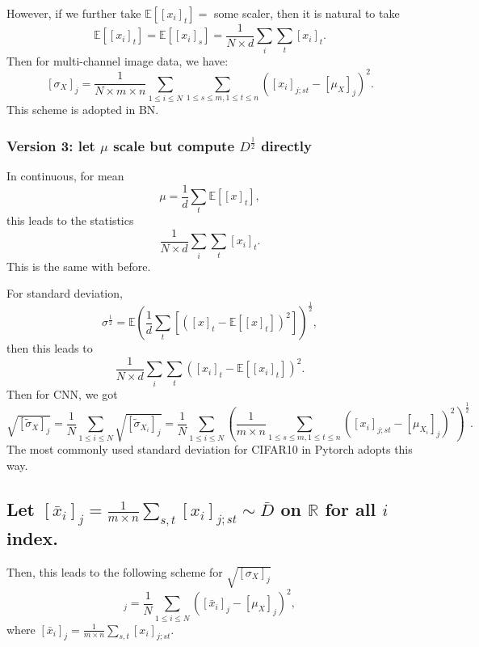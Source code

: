 However, if we further take $\mathbb{E}[[x_i]_t] = $ some scaler, then it is natural to take  
\begin{equation}\label{key}
\mathbb{E}[[x_i]_t] = \mathbb{E}[[x_i]_s] = \frac{1}{N \times d} \sum_{i} \sum_{t} [x_i]_t.
\end{equation}
Then for multi-channel image data, we have:
\begin{equation}\label{key}
[\sigma_X]_j = \frac{1}{ N \times m\times n} \sum_{ 1 \le i \le N} \sum_{1\le s \le m, 1 \le t \le n} ([x_i]_{j;st} -[\mu_X]_j )^2.
\end{equation}
This scheme is adopted in BN.

\subsubsection{Version 3:   let $\mu$  scale but compute $D^{\frac{1}{2}}$ directly}
In continuous, for mean
\begin{equation}\label{key}
\mu = \frac{1}{d} \sum_t \mathbb{E}[[x]_t],
\end{equation}
this leads to the statistics 
\begin{equation}\label{key}
\frac{1}{N \times d} \sum_{i} \sum_{t} [x_i]_t.
\end{equation}
This is the same with before.

For standard deviation,
\begin{equation}\label{key}
\sigma^{\frac{1}{2}} =  \mathbb{E} (\frac{1}{d} \sum_t [([x]_t - \mathbb{E}[[x]_t])^2])^{\frac{1}{2}},
\end{equation}
then this leads to
\begin{equation}\label{key}
\frac{1}{N \times d} \sum_{i} \sum_{t} ([x_i]_t - \mathbb{E}[[x_i]_t])^2.
\end{equation}
Then for CNN, we got
\begin{equation}\label{key}
\sqrt{[\tilde \sigma_X]_j} = \frac{1}{ N} \sum_{ 1 \le i \le N} \sqrt{[\tilde \sigma_{X_i}]_j}  =\frac{1}{ N} \sum_{ 1 \le i \le N}  \left( \frac{1}{m\times n}\sum_{1\le s \le m, 1 \le t \le n} ([x_i]_{j;st} -[\mu_{X_i}]_j )^2 \right)^{\frac{1}{2}}.
\end{equation}
The most commonly used standard deviation for CIFAR10 in Pytorch adopts this way.



\subsection{Let $ [\bar x_i]_j  = \frac{1}{m\times n} \sum_{s,t} [x_i]_{j;st} \sim \bar D$ on $\mathbb{R}$ for all $i$ index.}
Then, this leads to the following scheme for $\sqrt{[\sigma_X]_j}$ 
\begin{equation}
[\bar \sigma_X]_j = \frac{1}{ N } \sum_{ 1 \le i \le N} ([\bar x_i]_{j} -[\mu_X]_j )^2,
\end{equation}
where $[\bar x_i]_j  = \frac{1}{m\times n} \sum_{s,t} [x_i]_{j;st}$.

